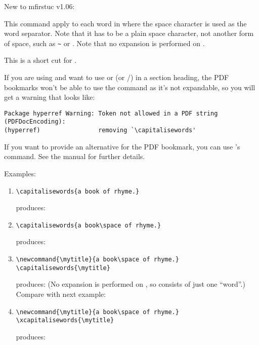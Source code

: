 \documentclass{nlctdoc}
\begin{document}
New to mfirstuc v1.06:
\begin{definition}[\DescribeMacro{\capitalisewords}]
\end{definition}
This command apply  to each word in 
where the space character is used as the word separator. Note that
it has to be a plain space character, not another form of space,
such as \verb|~| or . Note that no expansion is performed
on .

\begin{definition}[\DescribeMacro{\xcapitalisewords}]
\end{definition}
This is a short cut for
.

\begin{important}
If you are using  and want to use 
or  (or \slash{}) 
in a section heading, the PDF bookmarks won't be able to use the command 
as it's not expandable, so you will get a warning that looks like:
\begin{verbatim}
Package hyperref Warning: Token not allowed in a PDF string 
(PDFDocEncoding):
(hyperref)                removing `\capitalisewords'
\end{verbatim}
If you want to provide an alternative for the PDF bookmark, you can
use 's  command. See the
 manual for further details.
\end{important}

Examples:
\begin{enumerate}
\item 
\begin{verbatim}
\capitalisewords{a book of rhyme.}
\end{verbatim}
produces:

\item
\begin{verbatim}
\capitalisewords{a book\space of rhyme.}
\end{verbatim}
produces:

\item
\begin{verbatim}
\newcommand{\mytitle}{a book\space of rhyme.}
\capitalisewords{\mytitle}
\end{verbatim}
produces:
\newcommand{\mytitle}{a book\space of rhyme.}
\capitalisewords{\mytitle}
(No expansion is performed on , so 
consists of just one ``word''.) Compare with next example:

\item
\begin{verbatim}
\newcommand{\mytitle}{a book\space of rhyme.}
\xcapitalisewords{\mytitle}
\end{verbatim}
produces:
\xcapitalisewords{\mytitle}

\end{enumerate}
\end{document}
